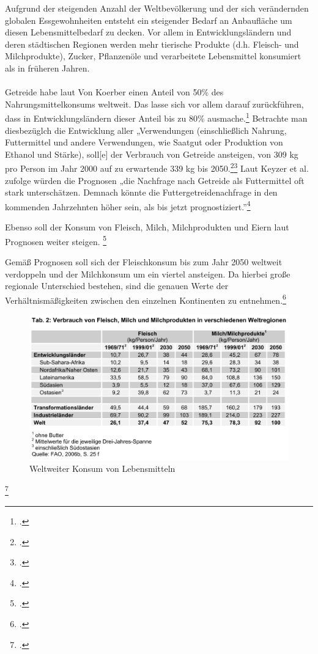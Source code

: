 \documentclass{scrartcl}
\begin{document}
Aufgrund der steigenden Anzahl der Weltbevölkerung und der sich verändernden globalen Essgewohnheiten entsteht ein steigender Bedarf an Anbaufläche um diesen Lebensmittelbedarf zu decken. Vor allem in Entwicklungsländern und deren städtischen Regionen werden mehr tierische Produkte (d.h. Fleisch- und Milchprodukte), Zucker, Pflanzenöle und verarbeitete Lebensmittel konsumiert als in früheren Jahren. \\
\\Getreide habe laut Von Koerber einen Anteil von 50\% des Nahrungsmittelkonsums weltweit. Das lasse sich vor allem darauf zurückführen, dass in Entwicklungsländern dieser Anteil bis zu 80\% ausmache.\footcite[Vgl.][S.4ff]{VonKoerber2008Globale-trends}
Betrachte man diesbezüglch die Entwicklung aller „Verwendungen (einschließlich Nahrung, Futtermittel und andere Verwendungen, wie Saatgut oder Produktion von Ethanol und Stärke), soll[e] der Verbrauch von Getreide ansteigen, von 309 kg pro Person im Jahr 2000 auf zu erwartende 339 kg bis 2050.\footcite[S.3ff]{VonKoerber2008Globale-trends}\footcite[vgl.][S.23ff]{FAO2006World2030/2050} 
Laut Keyzer et al. zufolge würden die Prognosen „die Nachfrage nach Getreide als Futtermittel oft stark unterschätzen.
Demnach könnte die Futtergetreidenachfrage in den kommenden Jahrzehnten höher sein, als bis jetzt prognostiziert.”\footcite[S.3f]{VonKoerber2008Globale-trends}

Ebenso soll der Konsum von Fleisch, Milch, Milchprodukten und Eiern laut Prognosen weiter steigen. \footcite[Vgl.][S.4f]{VonKoerber2008Globale-trends}

Gemäß Prognosen soll sich der Fleischkonsum bis zum Jahr 2050 weltweit verdoppeln und der Milchkonsum um ein viertel ansteigen. Da hierbei große regionale Unterschied bestehen, sind die genauen Werte der Verhältnismäßigkeiten zwischen den einzelnen Kontinenten \label{fig:konsumweltweit} zu entnehmen.\footcite[Vgl.][S.4]{VonKoerber2008Globale-trends}

\begin{figure}[htbp]
\centering
\includegraphics[width=16cm]{image_folder/KonsumWeltweit.png}
\caption{Weltweiter Konsum von Lebensmitteln}
\label{fig:konsumweltweit}
\end{figure}\footcite[S.4f]{VonKoerber2008Globale-trends}
\end{document}
